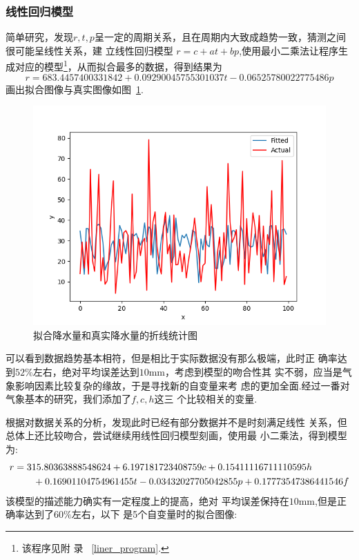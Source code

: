\documentclass[UTF8, a4paper]{ctexart}
\begin{document}
\subsubsection{线性回归模型}

简单研究，发现$r,t,p$呈一定的周期关系，且在周期内大致成趋势一致，猜测之间很可能呈线性关系，建
立线性回归模型 $r=c+at+bp$,使用最小二乘法让程序生成对应的模型\footnote{该程序见附
	录~\textcolor{red}{ \ref{liner_program}}.}，从而拟合最多的数据，得到结果为
$$r=683.4457400331842+0.09290045755301037t-0.06525780022775486p$$画出拟合图像与真实图像如图~\textcolor{red}{\ref{pic7}}.

\begin{figure}[h!]
	\centering
	\includegraphics[scale=0.3]{../src/try_match/ols_two.png}
	\caption{拟合降水量和真实降水量的折线统计图\label{pic7}}

\end{figure}
可以看到数据趋势基本相符，但是相比于实际数据没有那么极端，此时正
确率达到$52\%$左右，绝对平均误差达到$10$\si{\milli\meter}，考虑到模型的吻合性其
实不弱，应当是气象影响因素比较复杂的缘故，于是寻找新的自变量来考
虑的更加全面.经过一番对气象基本的研究，我们添加了$f,c,h$这三
个比较相关的变量.

根据对数据关系的分析，发现此时已经有部分数据并不是时刻满足线性
关系，但总体上还比较吻合，尝试继续用线性回归模型刻画，使用最
小二乘法，得到模型为:
\begin{align}
	\notag
	r & =315.80363888548624+6.197181723408759c+0.15411116711110595h            \\
	\notag
	  & \qquad +0.16901104754961455t-0.03432027705042855p+0.17773547386441546f
\end{align}
该模型的描述能力确实有一定程度上的提高，绝对
平均误差保持在$10$\si{\milli\meter},但是正确率达到了$60\%$左右，以下
是5个自变量时的拟合图像:
\end{document}
